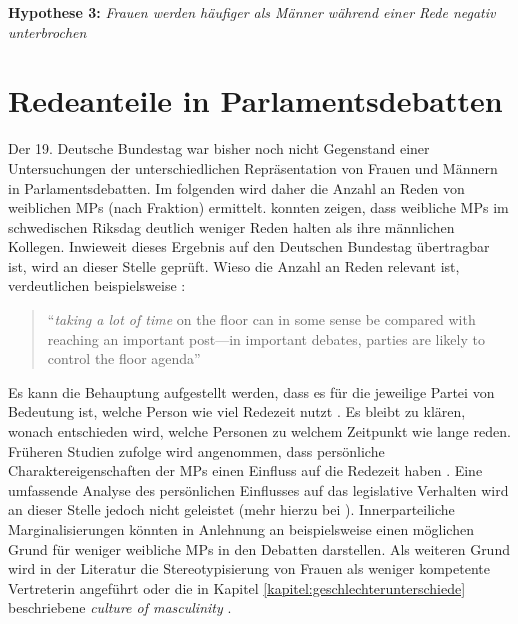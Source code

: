 \documentclass[12pt, 
    twoside=false, 
    bibliography=totoc, 
    numbers=endperiod, 
    headings=normal, 
    toc=chapterentrydotfill
    ]{scrbook}
\begin{document}
\textbf{Hypothese 3:} \emph{Frauen werden häufiger als Männer während einer Rede negativ unterbrochen}



\section{Redeanteile in Parlamentsdebatten}\label{kap:redenanteile}

Der 19. Deutsche Bundestag war bisher noch nicht Gegenstand einer Untersuchungen der unterschiedlichen Repräsentation von Frauen und Männern in Parlamentsdebatten. Im folgenden wird daher die Anzahl an Reden von weiblichen MPs (nach Fraktion) ermittelt. \textcite{back_2014} konnten zeigen, dass weibliche MPs im schwedischen Riksdag deutlich weniger Reden halten als ihre männlichen Kollegen. Inwieweit dieses Ergebnis auf den Deutschen Bundestag übertragbar ist, wird an dieser Stelle geprüft. Wieso die Anzahl an Reden relevant ist, verdeutlichen beispielsweise \textcite{back_2014}:

\citereset
\begin{quote}
     \enquote{\emph{taking a lot of time} on the floor can in some sense be compared with reaching an important post—in important debates, parties are likely to control the floor agenda} \parencites[507]{back_2014}
\end{quote}

Es kann die Behauptung aufgestellt werden, dass es für die jeweilige Partei von Bedeutung ist, welche Person wie viel Redezeit nutzt \parencite[vgl.][]{proksch_2012}. Es bleibt zu klären, wonach entschieden wird, welche Personen zu welchem Zeitpunkt wie lange reden.
%
Früheren Studien zufolge wird angenommen, dass persönliche Charaktereigenschaften der MPs einen Einfluss auf die Redezeit haben \parencite[505]{back_2014}. Eine umfassende Analyse des persönlichen Einflusses auf das legislative Verhalten wird an dieser Stelle jedoch nicht geleistet (mehr hierzu bei \textcite{saalfeld_2011}). Innerparteiliche Marginalisierungen könnten in Anlehnung an \textcite[507]{back_2014} beispielsweise einen möglichen Grund für weniger weibliche MPs in den Debatten darstellen. Als weiteren Grund wird in der Literatur die Stereotypisierung von Frauen als weniger kompetente Vertreterin angeführt oder die in Kapitel \ref{kapitel:geschlechterunterschiede} beschriebene \emph{culture of masculinity} \parencites[507]{back_2014}{lovenduski_2005}. 
\end{document}
